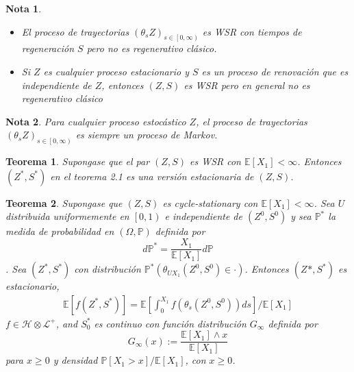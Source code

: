 \documentclass{article}
\newtheorem{Teo}{Teorema}[section]
\newtheorem{Note}{Nota}[section]
\newcommand{\esp}{\mathbb{E}}
\newcommand{\prob}{\mathbb{P}}
\numberwithin{equation}{section}
\begin{document}
\begin{Note}
\begin{itemize}
\item El proceso de trayectorias $\left(\theta_{s}Z\right)_{s\in\left[0,\infty\right)}$ es WSR con tiempos de regeneraci\'on $S$ pero no es regenerativo cl\'asico.
\item Si $Z$ es cualquier proceso estacionario y $S$ es un proceso de renovaci\'on que es independiente de $Z$, entonces $\left(Z,S\right)$ es WSR pero en general no es regenerativo cl\'asico
\end{itemize}
\end{Note}


\begin{Note}
Para cualquier proceso estoc\'astico $Z$, el proceso de trayectorias $\left(\theta_{s}Z\right)_{s\in\left[0,\infty\right)}$ es siempre un proceso de Markov.
\end{Note}

\begin{Teo}
Supongase que el par $\left(Z,S\right)$ es WSR con $\esp\left[X_{1}\right]<\infty$. Entonces $\left(Z^{*},S^{*}\right)$ en el teorema 2.1 es una versi\'on estacionaria de 
$\left(Z,S\right)$.
\end{Teo}


\begin{Teo}
Supongase que $\left(Z,S\right)$ es cycle-stationary con $\esp\left[X_{1}\right]<\infty$. Sea $U$ distribuida uniformemente en $\left[0,1\right)$ e independiente de $\left(Z^{0},S^{0}\right)$ y sea $\prob^{*}$ la medida de probabilidad en $\left(\Omega,\prob\right)$ definida por $$d\prob^{*}=\frac{X_{1}}{\esp\left[X_{1}\right]}d\prob$$. Sea $\left(Z^{*},S^{*}\right)$ con distribuci\'on $\prob^{*}\left(\theta_{UX_{1}}\left(Z^{0},S^{0}\right)\in\cdot\right)$. Entonces $\left(Z^{}*,S^{*}\right)$ es estacionario,
\begin{eqnarray*}
\esp\left[f\left(Z^{*},S^{*}\right)\right]=\esp\left[\int_{0}^{X_{1}}f\left(\theta_{s}\left(Z^{0},S^{0}\right)\right)ds\right]/\esp\left[X_{1}\right]
\end{eqnarray*}
$f\in\mathcal{H}\otimes\mathcal{L}^{+}$, and $S_{0}^{*}$ es continuo con funci\'on distribuci\'on $G_{\infty}$ definida por $$G_{\infty}\left(x\right):=\frac{\esp\left[X_{1}\right]\wedge x}{\esp\left[X_{1}\right]}$$ para $x\geq0$ y densidad $\prob\left[X_{1}>x\right]/\esp\left[X_{1}\right]$, con $x\geq0$.
\end{Teo}
\end{document}
